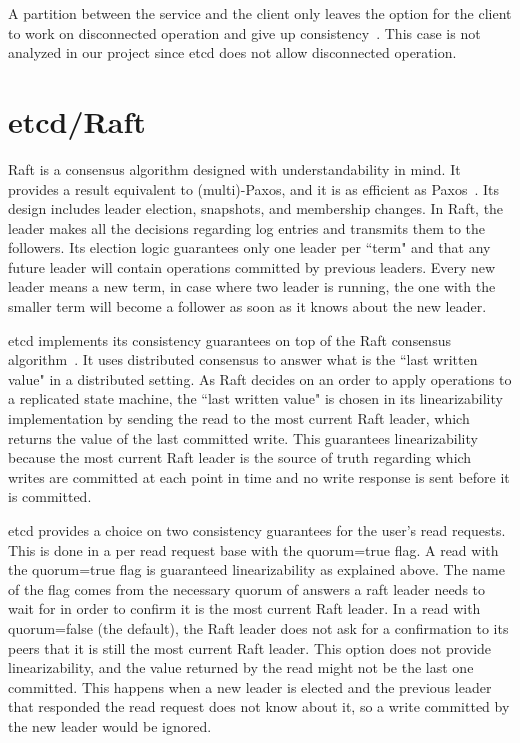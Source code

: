 \documentclass[12pt,conference]{IEEEtran}
\begin{document}
A partition between the service and the client only leaves the option for the client to work on disconnected operation and give up consistency~\cite{brewer2012cap}. This case is not analyzed in our project since etcd does not allow disconnected operation.

\section{etcd/Raft}

Raft is a consensus algorithm designed with understandability in mind. It provides a result equivalent to (multi)-Paxos, and it is as efficient as Paxos~\cite{ongaro2014search}. Its design includes leader election, snapshots, and membership changes. In Raft, the leader makes all the decisions regarding log entries and transmits them to the followers. Its election logic guarantees only one leader per “term" and that any future leader will contain operations committed by previous leaders. Every new leader means a new term, in case where two leader is running, the one with the smaller term will become a follower as soon as it knows about the new leader.

etcd implements its consistency guarantees on top of the Raft consensus algorithm~\cite{ongaro2014search,etcdGithubWebsite}. It uses distributed consensus to answer what is the “last written value" in a distributed setting. As Raft decides on an order to apply operations to a replicated state machine, the “last written value" is chosen in its linearizability implementation by sending the read to the most current Raft leader, which returns the value of the last committed write. This guarantees linearizability because the most current Raft leader is the source of truth regarding which writes are committed at each point in time and no write response is sent before it is committed. 

etcd provides a choice on two consistency guarantees for the user's read requests. This is done in a per read request base with the quorum=true flag. A read with the quorum=true flag is guaranteed linearizability as explained above. The name of the flag comes from the necessary quorum of answers a raft leader needs to wait for in order to confirm it is the most current Raft leader. In a read with quorum=false (the default), the Raft leader does not ask for a confirmation to its peers that it is still the most current Raft leader. This option does not provide linearizability, and the value returned by the read might not be the last one committed. This happens when a new leader is elected and the previous leader that responded the read request does not know about it, so a write committed by the new leader would be ignored. 
\end{document}
